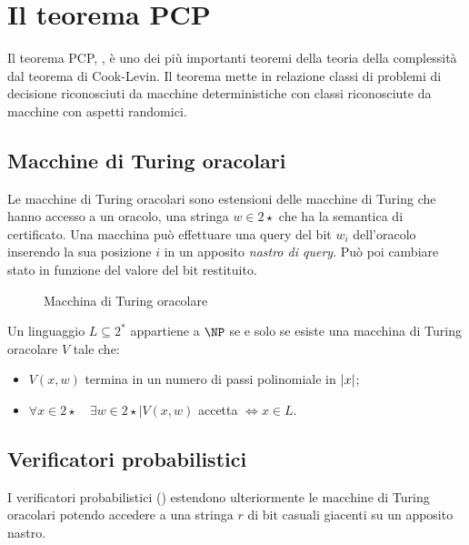 


\section{Il teorema PCP}
Il teorema PCP, , è uno dei più importanti teoremi della teoria della complessità dal teorema di Cook-Levin.
Il teorema mette in relazione classi di problemi di decisione riconosciuti da macchine deterministiche con classi riconosciute da macchine con aspetti randomici.


\subsection{Macchine di Turing oracolari}
Le macchine di Turing oracolari sono estensioni delle macchine di Turing che hanno accesso a un oracolo, una stringa $w\in 2\star$ che ha la semantica di certificato.
Una macchina può effettuare una query del bit $w_i$ dell'oracolo inserendo la sua posizione $i$ in un apposito \emph{nastro di query}.
Può poi cambiare stato in funzione del valore del bit restituito.

\begin{figure}[ht]
	\centering
	
	\caption{Macchina di Turing oracolare}
	\label{fig:mdtoracle}
\end{figure}

\begin{defin}
	Un linguaggio $L\subseteq 2^*$ appartiene a $\NP$ se e solo se esiste una macchina di Turing oracolare $V$ tale che:
	\begin{itemize}
		\item $V(x,w)$ termina in un numero di passi polinomiale in $|x|$;
		\item $\forall x\in 2\star \quad \exists w\in 2\star \mid V(x,w)$ accetta $\iff x\in L$.
	\end{itemize}
\end{defin}


\subsection{Verificatori probabilistici}
I verificatori probabilistici () estendono ulteriormente le macchine di Turing oracolari potendo accedere a una stringa $r$ di bit casuali giacenti su un apposito nastro.

